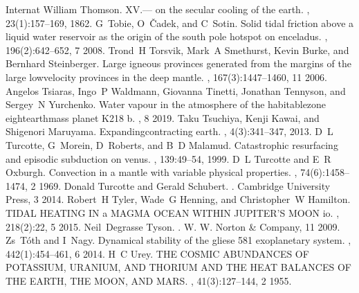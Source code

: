 \documentclass[letterpaper,10pt,english]{jupyterBook}
\begin{document}
\begin{sphinxthebibliography}{Internat}
\sphinxAtStartPar
William Thomson. XV.— on the secular cooling of the earth. , 23(1):157–169, 1862.
\sphinxAtStartPar
G Tobie, O Čadek, and C Sotin. Solid tidal friction above a liquid water reservoir as the origin of the south pole hotspot on enceladus. , 196(2):642–652, 7 2008.
\sphinxAtStartPar
Trond H Torsvik, Mark A Smethurst, Kevin Burke, and Bernhard Steinberger. Large igneous provinces generated from the margins of the large low\sphinxhyphen{}velocity provinces in the deep mantle. , 167(3):1447–1460, 11 2006.
\sphinxAtStartPar
Angelos Tsiaras, Ingo P Waldmann, Giovanna Tinetti, Jonathan Tennyson, and Sergey N Yurchenko. Water vapour in the atmosphere of the habitable\sphinxhyphen{}zone eight\sphinxhyphen{}earth\sphinxhyphen{}mass planet K2\sphinxhyphen{}18 b. , 8 2019.
\sphinxAtStartPar
Taku Tsuchiya, Kenji Kawai, and Shigenori Maruyama. Expanding\sphinxhyphen{}contracting earth. , 4(3):341–347, 2013.
\sphinxAtStartPar
D L Turcotte, G Morein, D Roberts, and B D Malamud. Catastrophic resurfacing and episodic subduction on venus. , 139:49–54, 1999.
\sphinxAtStartPar
D L Turcotte and E R Oxburgh. Convection in a mantle with variable physical properties. , 74(6):1458–1474, 2 1969.
\sphinxAtStartPar
Donald Turcotte and Gerald Schubert. . Cambridge University Press, 3 2014.
\sphinxAtStartPar
Robert H Tyler, Wade G Henning, and Christopher W Hamilton. TIDAL HEATING IN a MAGMA OCEAN WITHIN JUPITER'S MOON io. , 218(2):22, 5 2015.
\sphinxAtStartPar
Neil Degrasse Tyson. . W. W. Norton \& Company, 11 2009.
\sphinxAtStartPar
Zs Tóth and I Nagy. Dynamical stability of the gliese 581 exoplanetary system. , 442(1):454–461, 6 2014.
\sphinxAtStartPar
H C Urey. THE COSMIC ABUNDANCES OF POTASSIUM, URANIUM, AND THORIUM AND THE HEAT BALANCES OF THE EARTH, THE MOON, AND MARS. , 41(3):127–144, 2 1955.

\end{sphinxthebibliography}
\end{document}
